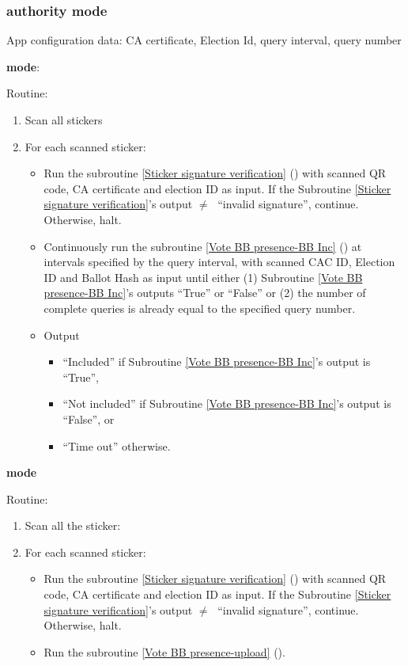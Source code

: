 \documentclass{article}
\begin{document}
\subsubsection{\remoteVotingCenter{} authority mode}


App configuration data: CA certificate, Election Id, query interval, query number

\textbf{\BBInclusionCheck{} mode}:


Routine:
\begin{enumerate}
    \item Scan all stickers
    \item For each scanned sticker:
    \begin{itemize}
        \item Run the subroutine \ref{Sticker signature verification} (\StickersignatureVerification{}) with scanned QR code, CA certificate and election ID as input. If the Subroutine \ref{Sticker signature verification}'s output $\neq\;$ ``invalid signature'', continue. Otherwise, halt.
    \item Continuously run the subroutine \ref{Vote BB presence-BB Inc} (\BBInclusionCheck{}) at intervals specified by the query interval, with scanned CAC ID, Election ID and Ballot Hash as input until either (1) Subroutine \ref{Vote BB presence-BB Inc}'s outputs ``True'' or ``False'' or (2) the number of complete queries is already equal to the specified query number. 
    \item Output 
    \begin{itemize}
        \item ``Included'' if Subroutine \ref{Vote BB presence-BB Inc}'s output is ``True'',
        \item ``Not included'' if Subroutine \ref{Vote BB presence-BB Inc}'s output is ``False'', or
        \item ``Time out'' otherwise.
    \end{itemize}
    \end{itemize}
\end{enumerate}

\textbf{\StickerBBUpload{}{} mode}

Routine:
\begin{enumerate}
    \item Scan all the sticker:
    \item For each scanned sticker:
    \begin{itemize}

        \item Run the subroutine \ref{Sticker signature verification} (\StickersignatureVerification{}) with scanned QR code, CA certificate and election ID as input. If the Subroutine \ref{Sticker signature verification}'s output $\neq\;$ ``invalid signature'', continue. Otherwise, halt.
        \item Run the subroutine \ref{Vote BB presence-upload} (\StickerBBUpload{}).
    \end{itemize}
\end{enumerate}
\end{document}
